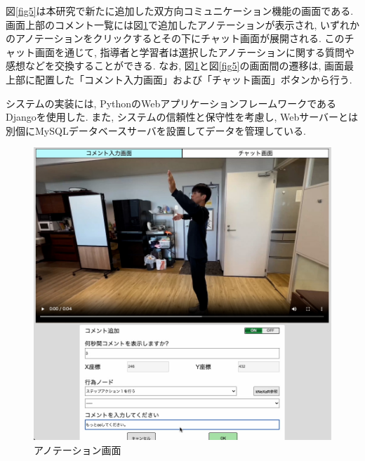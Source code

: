 図\ref{fig5}は本研究で新たに追加した双方向コミュニケーション機能の画面である. 画面上部のコメント一覧には図\ref{fig4}で追加したアノテーションが表示され, いずれかのアノテーションをクリックするとその下にチャット画面が展開される. このチャット画面を通じて, 指導者と学習者は選択したアノテーションに関する質問や感想などを交換することができる. なお, 図\ref{fig4}と図\ref{fig5}の画面間の遷移は, 画面最上部に配置した「コメント入力画面」および「チャット画面」ボタンから行う.

システムの実装には, PythonのWebアプリケーションフレームワークであるDjangoを使用した. また, システムの信頼性と保守性を考慮し, Webサーバーとは別個にMySQLデータベースサーバを設置してデータを管理している.

\begin{figure}[htbp]
    \centering
    \includegraphics[width=1.0\linewidth]{./image/demo_annotation.jpg}
    \caption{アノテーション画面}
    \label{fig4}
\end{figure}

